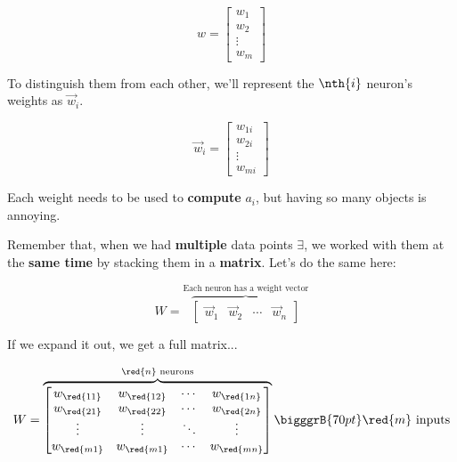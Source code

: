         \begin{equation}
            w = 
            \begin{bmatrix}
              w_1\\w_2\\ \vdots \\ w_m
            \end{bmatrix}
        \end{equation}
        
        To distinguish them from each other, we'll represent the $\nth{i}$ neuron's weights as $\vec{w}_i$.
        
        \begin{equation}
            \vec{w}_i = 
            \begin{bmatrix}
              w_{1i}\\w_{2i}\\ \vdots \\ w_{mi}
            \end{bmatrix}
        \end{equation}
            
        Each weight needs to be used to \textbf{compute} $a_i$, but having so many objects is annoying.
        
        Remember that, when we had \textbf{multiple} data points $\exi$, we worked with them at the \textbf{same time} by stacking them in a \textbf{matrix}. Let's do the same here:
        
        \begin{equation}
            W = 
            \overbrace{
                \begin{bmatrix}
                  \vec{w}_1 & \vec{w}_2 & \cdots & \vec{w}_n
                \end{bmatrix}
            }^{\text{Each neuron has a weight vector}}
        \end{equation}
        
        If we expand it out, we get a full matrix...
        
        \begin{equation}
            W = 
            \overbrace{
                \begin{bmatrix}
                  w_{\red{11}} & w_{\red{12}} & \cdots & w_{\red{1n}} \\
                  w_{\red{21}} & w_{\red{22}} & \cdots & w_{\red{2n}} \\
                  \vdots       & \vdots       & \ddots & \vdots \\
                  w_{\red{m1}} & w_{\red{m1}} & \cdots & w_{\red{mn}} \\
                \end{bmatrix}
            }^{\red{n} \text{ neurons}}
            \bigggrB{70pt} \red{m} \text{ inputs}
        \end{equation}
        
